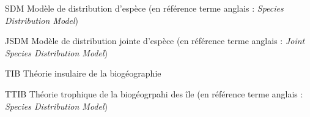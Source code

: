 \listedesfigures


\listeabrev
\begin{liste}

\item[SDM] Modèle de distribution d'espèce (en référence terme anglais : \textit{Species Distribution Model})

\item[JSDM] Modèle de distribution jointe d'espèce (en référence terme anglais : \textit{Joint Species Distribution Model})

\item[TIB] Théorie insulaire de la biogéographie

\item[TTIB] Théorie trophique de la biogéogrpahi des île (en référence terme anglais : \textit{Species Distribution Model})

\end{liste}




%
%


\cleardoublepage
